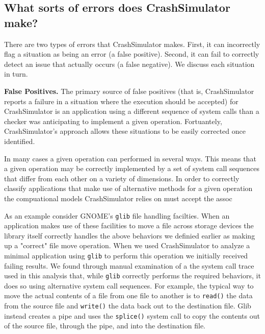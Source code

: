 \subsection{What sorts of errors does CrashSimulator make?}
There are two types of errors that CrashSimulator makes. First, it can 
incorrectly flag a situation as being an error (a false positive).  Second,
it can fail to correctly detect an issue that actually occurs (a false 
negative).  We discuss each situation in turn.

{\bf False Positives.}
The primary source of false positives (that is, CrashSimulator reports a failure
in a situation where the execution should be accepted) for CrashSimulator is an
application using a different sequence of system calls than a checker was
anticipating to implement a given operation.  Fortuantely, CrashSimulator's
approach allows these situations to be easily corrected once identified.

In many cases a given operation can performed in several ways.  This means that
a given operation may be correctly implemented by a set of system call sequences
that differ from each other on a variety of dimensions.  In order to correctly
classify applications that make use of alternative methods for a given operation
the compuational models CrashSimulator relies on must accept the assoc

As an example consider GNOME's {\tt glib} file handling facilties.  When an
application makes use of these facilities to move a file across storage devices
the library itself correctly handles the above behaviors we definied earlier as
making up a "correct" file move operation.  When we used CrashSimulator to
analyze a minimal application using {\tt glib} to perform this operation we
initially received failing results.  We found through manual examination of a
the system call trace used in this analysis that, while {\tt glib} correctly performs
the required behaviors, it does so using alternative system call sequences.  For
example, the typical way to move the actual contents of a file from one file to
another is to {\tt read()} the data from the source file and {\tt write()} the
data back out to the destination file.  Glib instead creates a pipe and uses the
{\tt splice()} system call to copy the contents out of the source file, through
the pipe, and into the destination file.

